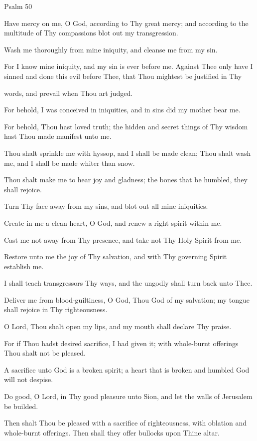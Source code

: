 \begin{center}
\vspace{1cm}
Psalm 50
\end{center}

\begin{hangparas}{.25in}{1}
Have mercy on me, O God, according to Thy great mercy; and according to the multitude of Thy compassions blot out my transgression.

Wash me thoroughly from mine iniquity, and cleanse me from my sin.

For I know mine iniquity, and my sin is ever before me. Against Thee only have I sinned and done this evil before Thee, that Thou mightest be justified in Thy

words, and prevail when Thou art judged.

For behold, I was conceived in iniquities, and in sins did my mother bear me.

For behold, Thou hast loved truth; the hidden and secret things of Thy wisdom hast Thou made manifest unto me.

Thou shalt sprinkle me with hyssop, and I shall be made clean; Thou shalt wash me, and I shall be made whiter than snow.

Thou shalt make me to hear joy and gladness; the bones that be humbled, they shall rejoice.

Turn Thy face away from my sins, and blot out all mine iniquities.

Create in me a clean heart, O God, and renew a right spirit within me.

Cast me not away from Thy presence, and take not Thy Holy Spirit from me.

Restore unto me the joy of Thy salvation, and with Thy governing Spirit establish me.

I shall teach transgressors Thy ways, and the ungodly shall turn back unto Thee.

Deliver me from blood-guiltiness, O God, Thou God of my salvation; my tongue shall rejoice in Thy righteousness.

O Lord, Thou shalt open my lips, and my mouth shall declare Thy praise.

For if Thou hadst desired sacrifice, I had given it; with whole-burnt offerings Thou shalt not be pleased.

A sacrifice unto God is a broken spirit; a heart that is broken and humbled God will not despise.

Do good, O Lord, in Thy good pleasure unto Sion, and let the walls of Jerusalem be builded.

Then shalt Thou be pleased with a sacrifice of righteousness, with oblation and whole-burnt offerings. Then shall they offer bullocks upon Thine altar.
\end{hangparas}

